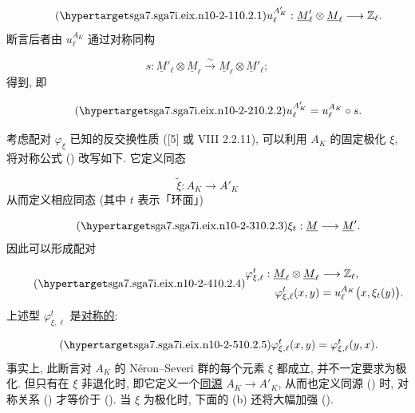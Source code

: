 \begin{equation}\tag{\SGARefTarget{sga7.sga7i.eix.n10-2-1}{10.2.1}}
u_\ell^{A'_K}:\underline M'_\ell\otimes\underline M_\ell
 \longrightarrow\mathbb Z_\ell.
\end{equation}
断言后者由 $u_\ell^{A_K}$ 通过对称同构

\begin{equation*}
s:\underline M'_\ell\otimes\underline M_\ell
 \xrightarrow{\ \sim\ }
 \underline M_\ell\otimes\underline M'_\ell;
\end{equation*}
得到, 即

\begin{equation}\tag{\SGARefTarget{sga7.sga7i.eix.n10-2-2}{10.2.2}}
u_\ell^{A'_K}=u_\ell^{A_K}\circ s.
\end{equation}

考虑配对 $\varphi_\xi$ 已知的反交换性质 ([5] 或 VIII 2.2.11), 可以利用 $A_K$ 的固定极化 $\xi$, 将对称公式 () 改写如下. 它定义同态

\begin{equation*}
\widetilde\xi:A_K\longrightarrow A'_K
\end{equation*}
从而定义相应同态 (其中 $t$ 表示「环面」)

\begin{equation}\tag{\SGARefTarget{sga7.sga7i.eix.n10-2-3}{10.2.3}}
\xi_t:\underline M\longrightarrow\underline M'.
\end{equation}
因此可以形成配对

\begin{equation}\tag{\SGARefTarget{sga7.sga7i.eix.n10-2-4}{10.2.4}}
\begin{aligned}
\varphi^t_{\xi,\ell}:\underline M_\ell\otimes\underline M_\ell
 &\longrightarrow\mathbb Z_\ell,\\
\varphi^t_{\xi,\ell}(x,y)&=u_\ell^{A_K}\bigl(x,\xi_t(y)\bigr).
\end{aligned}
\end{equation}
上述型 $\varphi^t_{\xi,\ell}$ 是\underline{对称的}:

\begin{equation}\tag{\SGARefTarget{sga7.sga7i.eix.n10-2-5}{10.2.5}}
\varphi^t_{\xi,\ell}(x,y)=\varphi^t_{\xi,\ell}(y,x).
\end{equation}
事实上, 此断言对 $A_K$ 的 Néron--Severi 群的每个元素 $\xi$ 都成立, 并不一定要求为极化. 但只有在 $\xi$ 非退化时, 即它定义一个\underline{同源} $A_K\longrightarrow A'_K$, 从而也定义同源 () 时, 对称关系 () 才等价于 (). 当 $\xi$ 为极化时, 下面的 (b) 还将大幅加强 ().

